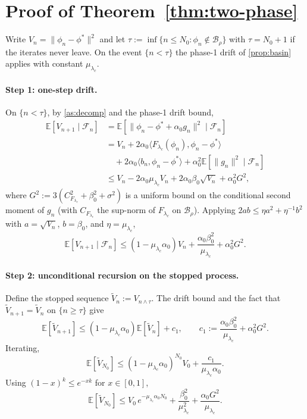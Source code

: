 \documentclass{article}
\theoremstyle{plain}
\theoremstyle{definition}
\theoremstyle{remark}
\newcommand{\E}{\mathbb{E}}
\newcommand{\B}{\mathcal{B}}
\newcommand{\F}{\mathcal{F}}
\begin{document}
\section{Proof of Theorem~\ref{thm:two-phase}}\label{app:thm-twophase}

Write $V_n=\|\phi_n-\phi^\ast\|^2$ and let $\tau:=\inf\{n\le N_0:\phi_n\notin\B_\rho\}$ with $\tau=N_0+1$ if the iterates never leave. On the event $\{n<\tau\}$ the phase-1 drift of \cref{prop:basin} applies with constant $\mu_{\lambda_c}$.

\paragraph{Step 1: one-step drift.}
On $\{n<\tau\}$, by \cref{as:decomp} and the phase-1 drift bound,
\[
\begin{aligned}
\E[V_{n+1}\mid\F_n]
&=\E\!\left[\|\phi_n-\phi^\ast+\alpha_0 g_n\|^2\mid\F_n\right]\\
&=V_n+2\alpha_0\langle F_{\lambda_c}(\phi_n),\phi_n-\phi^\ast\rangle\\
&\quad+2\alpha_0\langle b_n,\phi_n-\phi^\ast\rangle+\alpha_0^2\E[\|g_n\|^2\mid\F_n]\\
&\le V_n-2\alpha_0\mu_{\lambda_c}V_n
+2\alpha_0\beta_0\sqrt{V_n}+\alpha_0^2 G^2,
\end{aligned}
\]
where $G^2:=3(C_{F_{\lambda_c}}^2+\beta_0^2+\sigma^2)$ is a uniform bound on the conditional second moment of $g_n$ (with $C_{F_{\lambda_c}}$ the sup-norm of $F_{\lambda_c}$ on $\B_\rho$). Applying $2a b\le \eta a^2+\eta^{-1}b^2$ with $a=\sqrt{V_n}$, $b=\beta_0$, and $\eta=\mu_{\lambda_c}$,
\[
\E[V_{n+1}\mid\F_n]\le (1-\mu_{\lambda_c}\alpha_0)V_n
+\frac{\alpha_0\beta_0^2}{\mu_{\lambda_c}}+\alpha_0^2 G^2.
\]

\paragraph{Step 2: unconditional recursion on the stopped process.}
Define the stopped sequence $\tilde V_n:=V_{n\wedge\tau}$. The drift bound and the fact that $\tilde V_{n+1}=\tilde V_n$ on $\{n\ge\tau\}$ give
\[
\E[\tilde V_{n+1}]\le (1-\mu_{\lambda_c}\alpha_0)\E[\tilde V_n]+c_1,
\qquad c_1:=\frac{\alpha_0\beta_0^2}{\mu_{\lambda_c}}+\alpha_0^2 G^2.
\]
Iterating,
\[
\E[\tilde V_{N_0}]\le (1-\mu_{\lambda_c}\alpha_0)^{N_0}V_0+\frac{c_1}{\mu_{\lambda_c}\alpha_0}.
\]
Using $(1-x)^k\le e^{-xk}$ for $x\in[0,1]$,
\[
\E[\tilde V_{N_0}]\le V_0\,e^{-\mu_{\lambda_c}\alpha_0 N_0}+\frac{\beta_0^2}{\mu_{\lambda_c}^2}+\frac{\alpha_0 G^2}{\mu_{\lambda_c}}.
\]
\end{document}
